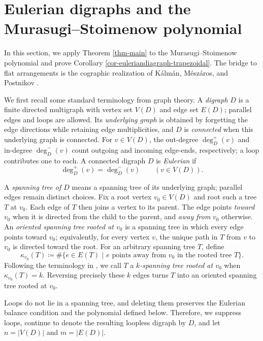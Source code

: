 \documentclass[12pt]{amsart}
\numberwithin{equation}{section}
\numberwithin{theorem}{section}
\begin{document}
\section{Eulerian digraphs and the Murasugi--Stoimenow polynomial}
\label{sec-eulerian-digraphs}

In this section, we apply Theorem \ref{thm-main} to the Murasugi–Stoimenow polynomial and prove Corollary \ref{cor-euleriandiagraph-trapezoidal}. The bridge to flat arrangements is the cographic realization of Kálmán, Mészáros, and Postnikov \cite[Sections~4.2 and~5.1]{KMP}.

We first recall some standard terminology from graph theory.
A \emph{digraph} $D$ is a finite directed multigraph with vertex set $V(D)$ and edge set $E(D)$; parallel edges and loops are allowed. Its \emph{underlying graph} is obtained by forgetting the edge directions while retaining edge multiplicities, and $D$ is \emph{connected} when this underlying graph is connected. For $v\in V(D)$, the out-degree $\deg_D^+(v)$ and in-degree $\deg_D^-(v)$ count outgoing and incoming edge-ends, respectively; a loop contributes one to each.
A connected digraph $D$ is \emph{Eulerian} if
\begin{equation*}
  \deg_D^+(v)=\deg_D^-(v)\qquad (v\in V(D)).
\end{equation*}

A \emph{spanning tree of $D$} means a spanning tree of its underlying graph; parallel edges remain distinct choices. Fix a root vertex $v_0\in V(D)$ and root such a tree $T$ at $v_0$. Each edge of $T$ then joins a vertex to its parent. The edge points \emph{toward} $v_0$ when it is directed from the child to the parent, and \emph{away from} $v_0$ otherwise. An \emph{oriented spanning tree rooted at $v_0$} is a spanning tree in which every edge points toward $v_0$; equivalently, for every vertex $v$, the unique path in $T$ from $v$ to $v_0$ is directed toward the root. For an arbitrary spanning tree $T$, define
\begin{equation*}
  \kappa_{v_0}(T)\coloneqq \#\{e\in E(T)\,\,|\,\, e\text{ points away from $v_0$ in the rooted tree $T$}\}.
\end{equation*}
Following the terminology in \cite[Section~2.3]{KMP}, we call $T$ a
\emph{$k$-spanning tree rooted at $v_0$} when $\kappa_{v_0}(T)=k$.
Reversing precisely these $k$ edges turns $T$ into an oriented spanning tree rooted at $v_0$.

Loops do not lie in a spanning tree, and deleting them preserves the Eulerian balance condition and the polynomial defined below. Therefore, we suppress loops, continue to denote the resulting loopless digraph by $D$, and let $n=|V(D)|$ and $m=|E(D)|$.
\end{document}
